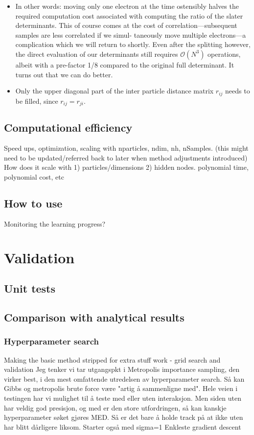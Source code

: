 \documentclass[twoside,english]{uiofysmaster}
\begin{document}
\begin{itemize}
	\item In other words: moving only one electron at the time ostensibly halves the required computation cost associated with computing the ratio of the slater determinants.
	This of course comes at the cost of correlation—subsequent samples are less correlated if we simul- taneously move multiple electrons—a complication which we will return to shortly.
	Even after the splitting however, the direct evaluation of our determinants still requires $\mathcal{O}(N^3)$ operations, albeit with a pre-factor 1/8 compared to the original full determinant. It turns out that we can do better.
	\item Only the upper diagonal part of the inter particle distance matrix $r_{ij}$ needs to be filled, since $r_{ij}=r_{ji}$. 
\end{itemize}
\cite{Ledum2017}

\section{Computational efficiency}
Speed ups, optimization, scaling with nparticles, ndim, nh, nSamples. (this might need to be updated/referred back to later when method adjustments introduced)
How does it scale with 1) particles/dimensions 2) hidden nodes. polynomial time, polynomial cost, etc

\section{How to use}
Monitoring the learning progress?


\chapter{Validation}
\section{Unit tests}

\section{Comparison with analytical results}

\subsection{Hyperparameter search}
Making the basic method stripped for extra stuff work - grid search and validation
Jeg tenker vi tar utgangspkt i Metropolis importance sampling, den virker best, i den mest omfattende utredelsen av hyperparameter search. Så kan Gibbs og metropolis brute force være "artig å sammenligne med". Hele veien i testingen har vi mulighet til å teste med eller uten interaksjon. Men siden uten har veldig god presisjon, og med er den store utfordringen, så kan kanskje hyperparameter søket gjøres MED. Så er det bare å holde track på at ikke uten har blitt dårligere liksom.
Starter også med sigma=1
Enkleste gradient descent
\end{document}
